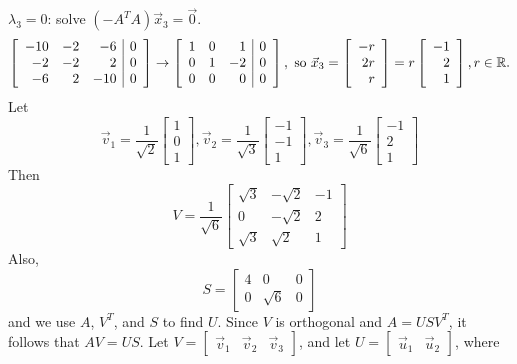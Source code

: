 \documentclass{ximera}
\begin{document}
\begin{example}
\begin{explanation}
$\lambda_3=0$: solve $(-A^TA)\vec{x}_3= \vec{0}$.
\[ \left[\begin{array}{rrr|r}
-10 & -2 & -6 & 0 \\ -2 & -2 & 2 & 0 \\ -6 & 2 & -10 & 0
\end{array}\right]
\rightarrow
\left[\begin{array}{rrr|r}
1 & 0 & 1 & 0 \\ 0 & 1 & -2 & 0 \\ 0 & 0 & 0 & 0
\end{array}\right],
\mbox{ so }
\vec{x}_3=\left[\begin{array}{r} -r \\ 2r \\ r \end{array}\right]
=r\left[\begin{array}{r} -1 \\ 2 \\ 1 \end{array}\right],
r\in \mathbb{R}. \]
Let
\[ \vec{v}_1=\frac{1}{\sqrt{2}}\left[\begin{array}{r} 1\\ 0\\ 1 \end{array}\right],
\vec{v}_2=\frac{1}{\sqrt{3}}\left[\begin{array}{r} -1\\ -1\\ 1 \end{array}\right],
\vec{v}_3=\frac{1}{\sqrt{6}}\left[\begin{array}{r} -1\\ 2\\ 1 \end{array}\right]\]
Then
\[ V=\frac{1}{\sqrt{6}}\left[\begin{array}{rrr}
\sqrt 3 & -\sqrt 2 & -1  \\
0 & -\sqrt 2 & 2 \\
\sqrt 3 & \sqrt 2 & 1 \end{array}\right]\]
Also,
\[ S = \left[\begin{array}{rrr} 4 & 0 & 0 \\
0 & \sqrt 6 & 0 \end{array}\right]\]
and we use $A$, $V^T$, and $S$ to find $U$. Since $V$ is orthogonal and $A=US V^T$, it follows that $AV=US$.
Let $V=\left[\begin{array}{ccc} \vec{v}_1 & \vec{v}_2 & \vec{v}_3 \end{array}\right]$, and
let $U=\left[\begin{array}{cc} \vec{u}_1 & \vec{u}_2 \end{array}\right]$, where

\end{explanation}
\end{example}
\end{document}

